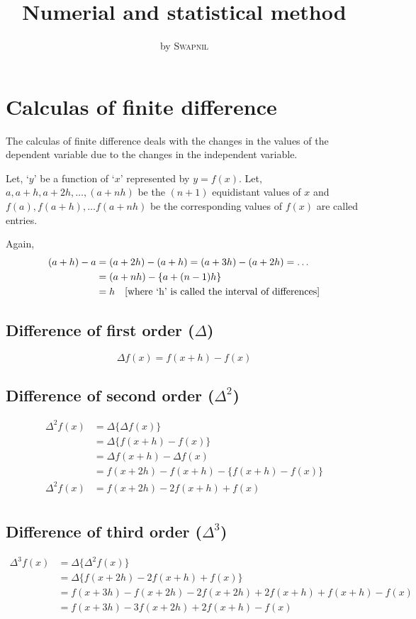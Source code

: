 \documentclass[10pt, twoside, a4paper]{article}
\title{Numerial and statistical method}
\author{ by
  \textsc{Swapnil}%
}
\date{}
\begin{document}
\maketitle


\section{Calculas of finite difference}%
The calculas of finite difference deals with the changes in the values of
the dependent variable due to the changes in the independent variable.

Let, `$y$' be a function of `$x$' represented by $y=f(x)$. Let, $a, a+h, a+2h,
\dots,(a+nh)$ be the $(n+1)$ equidistant values of $x$ and $f(a), f(a+h),\dots
f(a+nh)$ be the corresponding values of $f(x)$ are called entries.

\vskip10pt
\noindent Again,
\begin{align*}
  (a+h)-a &= (a+2h)-(a+h) =(a+3h)-(a+2h)=\dots\\
          &= (a+nh)-\{a+(n-1)h\}\\
          &= h \text{\hskip10pt [where `h' is called the interval of differences]}
\end{align*}%

\subsection{Difference of first order ($\Delta$)}%
\begin{equation*}
  \Delta f(x)=f(x+h)-f(x)
\end{equation*}%

\subsection{Difference of second order ($\Delta^2$)}%
\begin{align*}
  \Delta^2 f(x) &= \Delta \{\Delta f(x)\}\\
                &= \Delta \{f(x+h)-f(x)\}\\
                &= \Delta f(x+h)-\Delta f(x)\\
                &= f(x+2h)-f(x+h)-\{f(x+h)-f(x)\}\\
   \Delta^2f(x) &= f(x+2h)-2f(x+h)+f(x)\\
\end{align*}%

\subsection{Difference of third order ($\Delta^3$)}%
\begin{align*}
  \Delta^3 f(x) &= \Delta \{\Delta^2 f(x)\}\\
                &= \Delta \{f(x+2h)-2f(x+h)+f(x)\}\\
                &= f(x+3h)-f(x+2h)-2f(x+2h)+2f(x+h)+f(x+h)-f(x)\\
                &= f(x+3h)-3f(x+2h)+2f(x+h)-f(x)
\end{align*}%
\end{document}
